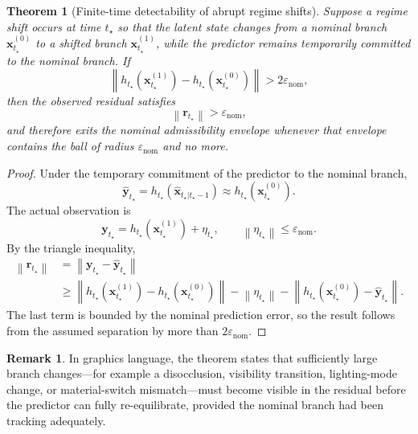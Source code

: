 \documentclass[11pt]{article}
\newcommand{\state}{\mathbf{x}}
\newcommand{\obs}{\mathbf{y}}
\newcommand{\pred}{\hat{\mathbf{y}}}
\newcommand{\resid}{\mathbf{r}}
\newcommand{\norm}[1]{\left\lVert #1 \right\rVert}
\theoremstyle{definition}
\newtheorem{remark}[definition]{Remark}
\theoremstyle{plain}
\newtheorem{theorem}[definition]{Theorem}
\begin{document}
\begin{theorem}[Finite-time detectability of abrupt regime shifts]
Suppose a regime shift occurs at time $t_\star$ so that the latent state changes from a nominal branch $\state^{(0)}_{t_\star}$ to a shifted branch $\state^{(1)}_{t_\star}$, while the predictor remains temporarily committed to the nominal branch. If
\begin{equation}
    \norm{h_{t_\star}(\state^{(1)}_{t_\star}) - h_{t_\star}(\state^{(0)}_{t_\star})} > 2\varepsilon_{\mathrm{nom}},
\end{equation}
then the observed residual satisfies
\begin{equation}
    \norm{\resid_{t_\star}} > \varepsilon_{\mathrm{nom}},
\end{equation}
and therefore exits the nominal admissibility envelope whenever that envelope contains the ball of radius $\varepsilon_{\mathrm{nom}}$ and no more.
\end{theorem}

\begin{proof}
Under the temporary commitment of the predictor to the nominal branch,
\begin{equation}
    \pred_{t_\star} = h_{t_\star}(\hat{\state}_{t_\star|t_\star-1}) \approx h_{t_\star}(\state^{(0)}_{t_\star}).
\end{equation}
The actual observation is
\begin{equation}
    \obs_{t_\star} = h_{t_\star}(\state^{(1)}_{t_\star}) + \eta_{t_\star},
    \qquad \norm{\eta_{t_\star}} \le \varepsilon_{\mathrm{nom}}.
\end{equation}
By the triangle inequality,
\begin{align}
    \norm{\resid_{t_\star}}
    &= \norm{\obs_{t_\star} - \pred_{t_\star}} \\
    &\ge \norm{h_{t_\star}(\state^{(1)}_{t_\star}) - h_{t_\star}(\state^{(0)}_{t_\star})}
       - \norm{\eta_{t_\star}}
       - \norm{h_{t_\star}(\state^{(0)}_{t_\star}) - \pred_{t_\star}}.
\end{align}
The last term is bounded by the nominal prediction error, so the result follows from the assumed separation by more than $2\varepsilon_{\mathrm{nom}}$.
\end{proof}

\begin{remark}
In graphics language, the theorem states that sufficiently large branch changes---for example a disocclusion, visibility transition, lighting-mode change, or material-switch mismatch---must become visible in the residual before the predictor can fully re-equilibrate, provided the nominal branch had been tracking adequately.
\end{remark}
\end{document}
